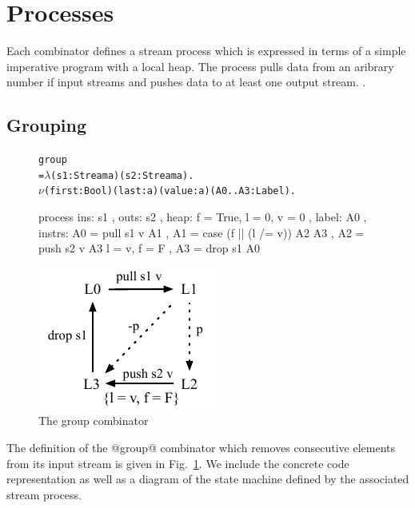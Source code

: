 \section{Processes}
\label{s:Processes}

Each combinator defines a stream process which is expressed in terms of a simple imperative program with a local heap. The process pulls data from an aribrary number if input streams and pushes data to at least one output stream. . 


\subsection{Grouping}
\begin{figure}

\begin{center}
\begin{alltt}
     group 
       = \(\lambda\) (s1: Stream a) (s2: Stream a). 
         \(\nu\) (first: Bool)  (last: a) (value: a) (A0..A3: Label).
\end{alltt}
\begin{code}
         process
         { ins:    { s1 }
         , outs:   { s2 }
         , heap:   { f = True, l = 0, v = 0 }
         , label:  A0
         , instrs: { A0 = pull s1 v            A1 {}
                   , A1 = case (f || (l /= v)) A2 {}  A3 {}
                   , A2 = push s2 v            A3 { l = v, f = F }
                   , A3 = drop s1              A0 {} } }
\end{code}
\end{center}
\vspace{1em}
\includegraphics[scale=1.1]{figures/state-group.pdf}
\caption{The group combinator}
\label{fig:Process:Group}
\end{figure}

The definition of the @group@ combinator which removes consecutive elements from its input stream is given in Fig.~\ref{fig:Process:Group}. We include the concrete code representation as well as a diagram of the state machine defined by the associated stream process.

